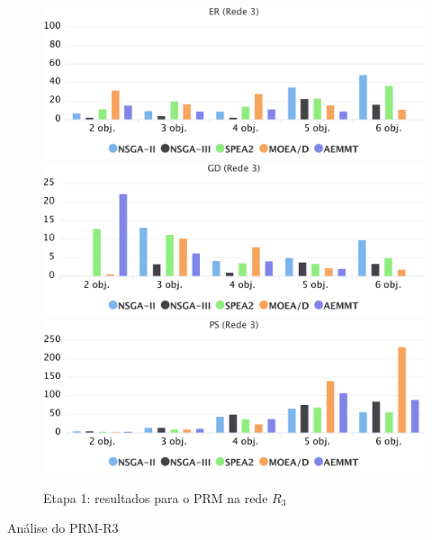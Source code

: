 \begin{figure}[!htbp]
	\caption{Etapa 1: resultados para o PRM na rede $R_3$}
	\label{fig_exp1_mrp_r3}
	\includegraphics[width=1\textwidth]{cap_experimentos/figs/etapa1/er-mrp-r3}
	\includegraphics[width=1\textwidth]{cap_experimentos/figs/etapa1/gd-mrp-r3}
	\includegraphics[width=1\textwidth]{cap_experimentos/figs/etapa1/ps-mrp-r3}
\end{figure}

Análise do PRM-R3

